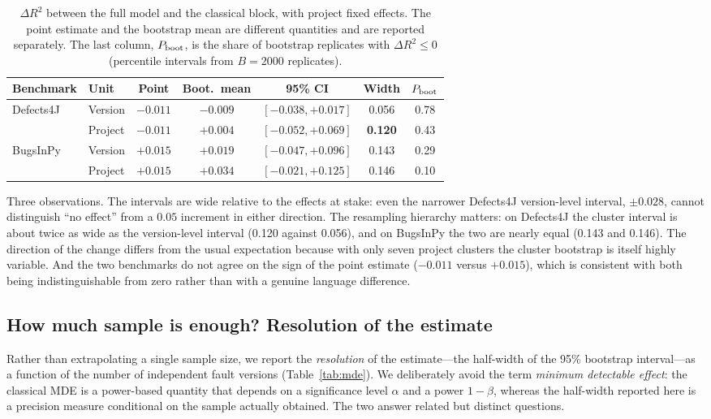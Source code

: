 \documentclass[preprint,12pt]{elsarticle}
\begin{document}
\begin{table}[t]
\centering
\caption{$\Delta R^2$ between the full model and the classical block, with
project fixed effects. The point estimate and the bootstrap mean are
different quantities and are reported separately. The last column,
$P_{\rm boot}$, is the share of bootstrap replicates with
$\Delta R^2 \le 0$ (percentile intervals from $B = 2000$ replicates).}
\label{tab:delta}
\begin{tabular}{llccccc}
\toprule
Benchmark & Unit & Point & Boot.\ mean & 95\% CI & Width & $P_{\rm boot}$ \\
\midrule
\multirow{2}{*}{Defects4J}
  & Version & $-0.011$ & $-0.009$ & $[-0.038, +0.017]$ & 0.056 & 0.78 \\
 & Project & $-0.011$ & $+0.004$ & $[-0.052, +0.069]$ & \textbf{0.120} & 0.43 \\
\midrule
\multirow{2}{*}{BugsInPy}
  & Version & $+0.015$ & $+0.019$ & $[-0.047, +0.096]$ & 0.143 & 0.29 \\
 & Project & $+0.015$ & $+0.034$ & $[-0.021, +0.125]$ & 0.146 & 0.10 \\
\bottomrule
\end{tabular}
\end{table}

Three observations. The intervals are wide relative to the effects at
stake: even the narrower Defects4J version-level interval,
$\pm 0.028$, cannot distinguish ``no effect'' from a $0.05$ increment in
either direction. The resampling hierarchy matters: on Defects4J the
cluster interval is about twice as wide as the version-level interval
(0.120 against 0.056), and on BugsInPy the two are nearly equal (0.143 and
0.146). The direction of the change differs from the usual expectation
because with only seven project clusters the cluster bootstrap is itself
highly variable. And the two benchmarks do not agree on the sign of the
point estimate ($-0.011$ versus $+0.015$), which is consistent with both
being indistinguishable from zero rather than with a genuine
language difference.

\subsection{How much sample is enough? Resolution of the estimate}

Rather than extrapolating a single sample size, we report the \emph{resolution} of the estimate---the half-width of the 95\% bootstrap interval---as a function of the number of independent fault versions (Table~\ref{tab:mde}). We deliberately avoid the term \emph{minimum detectable effect}: the classical MDE is a power-based quantity that depends on a significance level $\alpha$ and a power $1-\beta$, whereas the half-width reported here is a precision measure conditional on the sample actually obtained. The two answer related but distinct questions.
\end{document}
